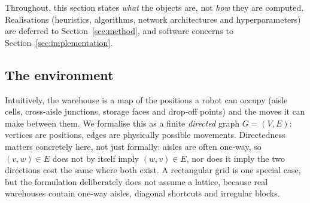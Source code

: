 \documentclass[../main.tex]{subfiles}
\begin{document}
Throughout, this section states \emph{what} the objects are, not \emph{how} they
are computed. Realisations (heuristics, algorithms, network architectures and
hyperparameters) are deferred to Section~\ref{sec:method}, and software
concerns to Section~\ref{sec:implementation}.

\subsection{The environment}
\label{sec:pf:env}

Intuitively, the warehouse is a map of the positions a robot can occupy
(aisle cells, cross-aisle junctions, storage faces and drop-off points) and
the moves it can make between them. We formalise this as a finite %
\emph{directed} graph $G=(V,E)$: vertices are positions, edges are physically
possible movements. Directedness matters concretely here, not just formally:
aisles are often one-way, so $(v,w) \in E$ does not by itself imply
$(w,v) \in E$, nor does it imply the two directions cost the same where both
exist. A rectangular grid is one special case, but the formulation
deliberately does not assume a lattice, because real warehouses contain
one-way aisles, diagonal shortcuts and irregular blocks.
\end{document}
